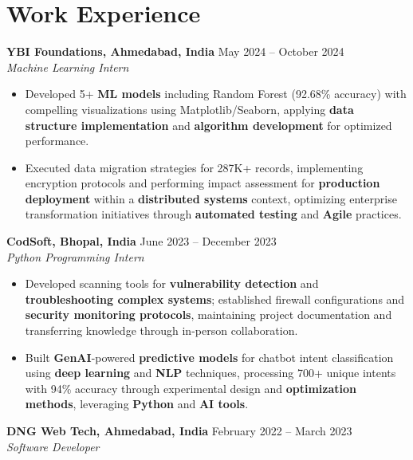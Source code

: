 \documentclass[a4paper,10pt]{article}
\begin{document}
\section*{Work Experience}
\textbf{YBI Foundations, Ahmedabad, India} \hfill May 2024 -- October 2024\\
\textit{Machine Learning Intern} \\
\begin{itemize}[leftmargin=*, itemsep=0pt, parsep=1pt]
\vspace{-6mm}
\item Developed 5+ \textbf{ML models} including Random Forest (92.68\% accuracy) with compelling visualizations using Matplotlib/Seaborn, applying \textbf{data structure implementation} and \textbf{algorithm development} for optimized performance.
\item Executed data migration strategies for 287K+ records, implementing encryption protocols and performing impact assessment for \textbf{production deployment} within a \textbf{distributed systems} context, optimizing enterprise transformation initiatives through \textbf{automated testing} and \textbf{Agile} practices.
\end{itemize}
\textbf{CodSoft, Bhopal, India} \hfill June 2023 -- December 2023\\
\textit{Python Programming Intern} \\
\begin{itemize}[leftmargin=*, itemsep=0pt, parsep=1pt]
\vspace{-6mm}
\item Developed scanning tools for \textbf{vulnerability detection} and \textbf{troubleshooting complex systems}; established firewall configurations and \textbf{security monitoring protocols}, maintaining project documentation and transferring knowledge through in-person collaboration.
\item Built \textbf{GenAI}-powered \textbf{predictive models} for chatbot intent classification using \textbf{deep learning} and \textbf{NLP} techniques, processing 700+ unique intents with 94\% accuracy through experimental design and \textbf{optimization methods}, leveraging \textbf{Python} and \textbf{AI tools}.
\vspace{-1mm}
\end{itemize}

\textbf{DNG Web Tech, Ahmedabad, India} \hfill February 2022 -- March 2023 \\
\textit{Software Developer} \\
\end{document}
